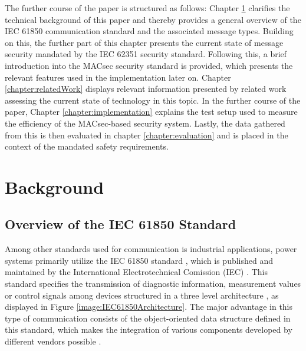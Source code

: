 \documentclass[conference, onecolumn, a4paper]{IEEEtran}
\begin{document}
\smallskip
The further course of the paper is structured as follows: Chapter \ref{chapter:fundamentals} clarifies the technical background of this paper and thereby 
provides a general overview of the IEC 61850 communication standard and the associated  message types. Building on this, the further part of this chapter 
presents the current state of message security mandated by the IEC 62351 security standard. Following this, a brief introduction into the MACsec security 
standard is provided, which presents the relevant features used in the implementation later on. Chapter \ref{chapter:relatedWork} displays relevant 
information presented by related work assessing the current state of technology in this topic. In the further course of the paper, Chapter 
\ref{chapter:implementation} explains the test setup used to measure the efficiency of the MACsec-based security system. Lastly, the data gathered from 
this is then evaluated in chapter \ref{chapter:evaluation} and is placed in the context of the mandated safety requirements. 

\section{Background}
\label{chapter:fundamentals}

\subsection{Overview of the IEC 61850 Standard}
\label{subchapter:IEC61850}
Among other standards used for communication is industrial applications, power systems primarily utilize the IEC 61850 standard \cite{IEC61850:2023}, 
which is published and maintained by the International Electrotechnical Comission (IEC) \cite{IEC61850_Overview:2006}. This standard specifies the 
transmission of diagnostic information, measurement values or control signals among devices structured in a three level architecture 
\cite{SGRWin_IEC61850Architecture:2021}, as displayed in Figure \ref{image:IEC61850Architecture}. The major advantage in this type of communication consists 
of the object-oriented data structure defined in this standard, which makes the integration of various components developed by different vendors possible 
\cite[p. 5643]{Review_IEC62351:2019}. 
\end{document}
